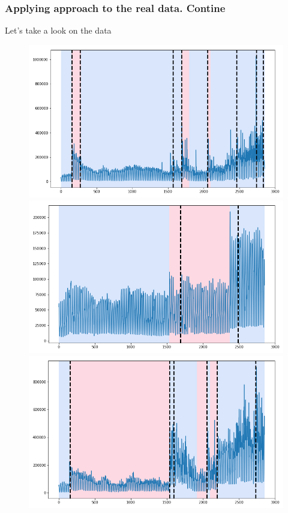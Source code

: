 \documentclass[intlimits, 9pt, unicode]{beamer}
\begin{document}
\begin{frame}
    \frametitle{Applying approach to the real data. Contine}
	
	Let's take a look on the data
\begin{figure}
	\includegraphics[scale=0.10]{images/033_country_a_cp}
	\includegraphics[scale=0.10]{images/034_country_b_cp}
	\includegraphics[scale=0.10]{images/035_country_c_cp}

\end{figure}
\end{frame}
\end{document}
